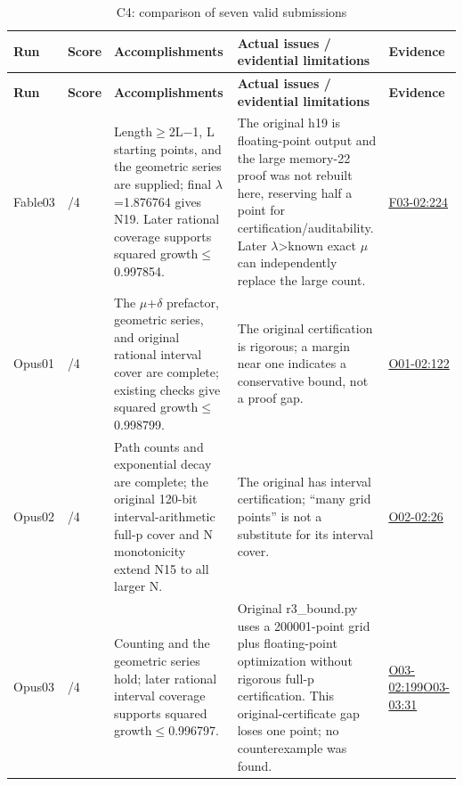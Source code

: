 \documentclass[11pt,a4paper]{article}
\begin{document}
{\fontsize{9.0}{12.6}\selectfont
\setlength{\tabcolsep}{2.5pt}
\begin{longtable}{>{\raggedright\arraybackslash}p{}>{\raggedright\arraybackslash}p{}>{\raggedright\arraybackslash}p{}>{\raggedright\arraybackslash}p{}>{\raggedright\arraybackslash}p{}}
\caption{C4: comparison of seven valid submissions}\\
\toprule
\textbf{Run} & \textbf{Score} & \textbf{Accomplishments} & \textbf{Actual issues /\allowbreak{} evidential limitations} & \textbf{Evidence}\tabularnewline
\midrule
\endfirsthead
\toprule
\textbf{Run} & \textbf{Score} & \textbf{Accomplishments} & \textbf{Actual issues /\allowbreak{} evidential limitations} & \textbf{Evidence}\tabularnewline
\midrule
\endhead
{}Fable03 & 3.5/\allowbreak{}4 & Length\ensuremath{\geq}2L\ensuremath{-}1,\allowbreak{} L starting points,\allowbreak{} and the geometric series are supplied; final \ensuremath{\lambda}=1.876764 gives N19. Later rational coverage supports squared growth\ensuremath{\leq}0.997854. & The original h19 is floating-point output and the large memory-22 proof was not rebuilt here,\allowbreak{} reserving half a point for certification/\allowbreak{}auditability. Later \ensuremath{\lambda}>known exact \ensuremath{\mu} can independently replace the large count. & \hyperref[src:F03-02]{F03-02:224}\tabularnewline
{}Opus01 & 4/\allowbreak{}4 & The \ensuremath{\mu}+\ensuremath{\delta} prefactor,\allowbreak{} geometric series,\allowbreak{} and original rational interval cover are complete; existing checks give squared growth\ensuremath{\leq}0.998799. & The original certification is rigorous; a margin near one indicates a conservative bound,\allowbreak{} not a proof gap. & \hyperref[src:O01-02]{O01-02:122}\tabularnewline
{}Opus02 & 4/\allowbreak{}4 & Path counts and exponential decay are complete; the original 120-bit interval-arithmetic full-p cover and N monotonicity extend N15 to all larger N. & The original has interval certification; “many grid points” is not a substitute for its interval cover. & \hyperref[src:O02-02]{O02-02:26}\tabularnewline
{}Opus03 & 3/\allowbreak{}4 & Counting and the geometric series hold; later rational interval coverage supports squared growth\ensuremath{\leq}0.996797. & Original r3\_bound.py uses a 200001-point grid plus floating-point optimization without rigorous full-p certification. This original-certificate gap loses one point; no counterexample was found. & \hyperref[src:O03-02]{O03-02:199}\newline \hyperref[src:O03-03]{O03-03:31}\tabularnewline

\end{longtable}}
\end{document}
